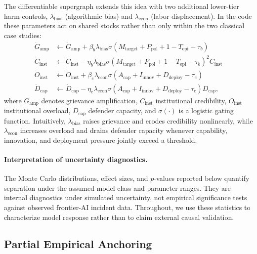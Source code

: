 \documentclass[11pt]{article}
\begin{document}
The differentiable supergraph extends this idea with two additional lower-tier harm controls, $\lambda_{\text{bias}}$ (algorithmic bias) and $\lambda_{\text{econ}}$ (labor displacement). In the code these parameters act on shared stocks rather than only within the two classical case studies:
\begin{align}
\dot{G}_{\text{amp}} &\leftarrow \dot{G}_{\text{amp}} + \beta_b \lambda_{\text{bias}} \sigma\!\left(M_{\text{target}} + P_{\text{pol}} + 1 - T_{\text{epi}} - \tau_b\right) \label{eq:bias1}\\
\dot{C}_{\text{inst}} &\leftarrow \dot{C}_{\text{inst}} - \eta_b \lambda_{\text{bias}} \sigma\!\left(M_{\text{target}} + P_{\text{pol}} + 1 - T_{\text{epi}} - \tau_b\right)^2 C_{\text{inst}} \label{eq:bias2}\\
\dot{O}_{\text{inst}} &\leftarrow \dot{O}_{\text{inst}} + \beta_e \lambda_{\text{econ}} \sigma\!\left(A_{\text{cap}} + I_{\text{innov}} + D_{\text{deploy}} - \tau_e\right) \label{eq:econ1}\\
\dot{D}_{\text{cap}} &\leftarrow \dot{D}_{\text{cap}} - \eta_e \lambda_{\text{econ}} \sigma\!\left(A_{\text{cap}} + I_{\text{innov}} + D_{\text{deploy}} - \tau_e\right) D_{\text{cap}}, \label{eq:econ2}
\end{align}
where $G_{\text{amp}}$ denotes grievance amplification, $C_{\text{inst}}$ institutional credibility, $O_{\text{inst}}$ institutional overload, $D_{\text{cap}}$ defender capacity, and $\sigma(\cdot)$ is a logistic gating function. Intuitively, $\lambda_{\text{bias}}$ raises grievance and erodes credibility nonlinearly, while $\lambda_{\text{econ}}$ increases overload and drains defender capacity whenever capability, innovation, and deployment pressure jointly exceed a threshold.

\paragraph{Interpretation of uncertainty diagnostics.} The Monte Carlo distributions, effect sizes, and $p$-values reported below quantify separation under the assumed model class and parameter ranges. They are internal diagnostics under simulated uncertainty, not empirical significance tests against observed frontier-AI incident data. Throughout, we use these statistics to characterize model response rather than to claim external causal validation.

\subsection{Partial Empirical Anchoring}
\label{sec:empirical_anchoring}
\end{document}
